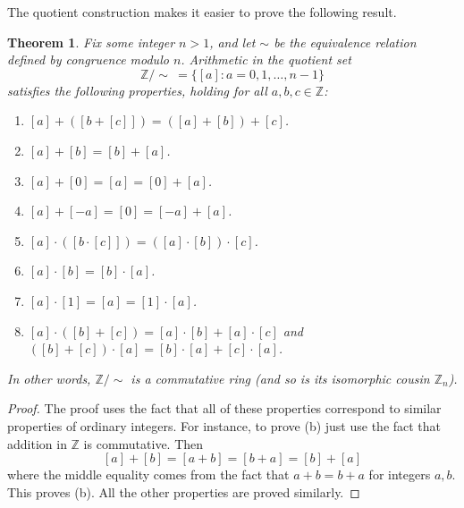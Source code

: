 \documentclass[11pt]{article}
\newtheorem{thm}{Theorem}[section]
\theoremstyle{definition}
\newcommand{\Z}{\mathbb{Z}} %
\begin{document}
The quotient construction makes it easier to prove the following
result.

\begin{thm}\label{thm:Z_n-is-a-ring}
  Fix some integer $n > 1$, and let $\sim$ be the equivalence relation
  defined by congruence modulo $n$.  Arithmetic in the quotient set
  $$\Z/\!\!\sim \ = \{[a]: a = 0, 1, \dots, n-1 \}$$ satisfies the
  following properties, holding for all $a, b, c \in \Z$:
  \begin{enumerate}
  \item  $[a] + ([b+[c]]) = ([a]+[b])+[c]$.
  \item  $[a]+[b] = [b]+[a]$. 
  \item  $[a]+[0] = [a] = [0]+[a]$.
  \item  $[a] + [-a] = [0] = [-a]+[a]$. 

  \item  $[a] \cdot ([b\cdot[c]]) = ([a]\cdot[b])\cdot[c]$.
  \item  $[a]\cdot[b] = [b]\cdot[a]$. 
  \item  $[a]\cdot[1] = [a] = [1]\cdot[a]$.

  \item $[a]\cdot ([b]+[c]) = [a]\cdot[b] + [a] \cdot [c]$ and
  $([b]+[c])\cdot [a] = [b]\cdot[a] + [c] \cdot [a]$.
  \end{enumerate}
  In other words, $\Z/\!\!\sim$ is a commutative ring (and so is its
  isomorphic cousin $\Z_n$).
\end{thm}


\begin{proof}
The proof uses the fact that all of these properties correspond to
similar properties of ordinary integers. For instance, to prove (b)
just use the fact that addition in $\Z$ is commutative. Then
\[
  [a] + [b] = [a+b] = [b+a] = [b]+[a]
\]
where the middle equality comes from the fact that $a+b=b+a$ for
integers $a,b$.  This proves (b). All the other properties are proved
similarly.
\end{proof}
\end{document}

